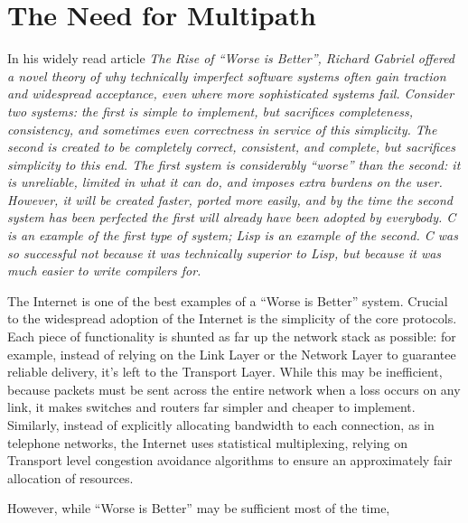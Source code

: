 \section{The Need for Multipath}
\label{sec:multi}

In his widely read article \em{The Rise of ``Worse is Better''}\em{}\cite{worseisbetter}, Richard Gabriel offered a novel theory of why technically imperfect software systems often gain traction and widespread acceptance, even where more sophisticated systems fail. Consider two systems: the first is simple to implement, but sacrifices completeness, consistency, and sometimes even correctness in service of this simplicity. The second is created to be completely correct, consistent, and complete, but sacrifices simplicity to this end. The first system is considerably ``worse'' than the second: it is unreliable, limited in what it can do, and imposes extra burdens on the user. However, it will be created faster, ported more easily, and by the time the second system has been perfected the first will already have been adopted by everybody. C is an example of the first type of system; Lisp is an example of the second. C was so successful not because it was technically superior to Lisp, but because it was much easier to write compilers for. 

The Internet is one of the best examples of a ``Worse is Better'' system. Crucial to the widespread adoption of the Internet is the simplicity of the core protocols. Each piece of functionality is shunted as far up the network stack as possible: for example, instead of relying on the Link Layer or the Network Layer to guarantee reliable delivery, it's left to the Transport Layer. While this may be inefficient, because packets must be sent across the entire network when a loss occurs on any link, it makes switches and routers far simpler and cheaper to implement. Similarly, instead of explicitly allocating bandwidth to each connection, as in telephone networks, the Internet uses statistical multiplexing, relying on Transport level congestion avoidance algorithms to ensure an approximately fair allocation of resources.

However, while ``Worse is Better'' may be sufficient most of the time,